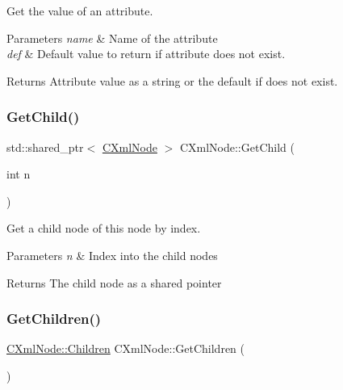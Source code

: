 Get the value of an attribute. 


\begin{DoxyParams}{Parameters}
{\em name} & Name of the attribute \\
\hline
{\em def} & Default value to return if attribute does not exist. \\
\hline
\end{DoxyParams}
\begin{DoxyReturn}{Returns}
Attribute value as a string or the default if does not exist. 
\end{DoxyReturn}
\mbox{\label{classxmlnode_1_1_c_xml_node_ac5700bda1faebcbe5bb042e043ea60be}} 
\subsubsection{\texorpdfstring{Get\+Child()}{GetChild()}}
{\footnotesize\ttfamily std\+::shared\+\_\+ptr$<$ \mbox{\hyperlink{classxmlnode_1_1_c_xml_node}{C\+Xml\+Node}} $>$ C\+Xml\+Node\+::\+Get\+Child (\begin{DoxyParamCaption}\item[{int}]{n }\end{DoxyParamCaption})}



Get a child node of this node by index. 


\begin{DoxyParams}{Parameters}
{\em n} & Index into the child nodes \\
\hline
\end{DoxyParams}
\begin{DoxyReturn}{Returns}
The child node as a shared pointer 
\end{DoxyReturn}
\mbox{\label{classxmlnode_1_1_c_xml_node_a03f86570ca40d4cc09c3e1841939a9d0}} 
\subsubsection{\texorpdfstring{Get\+Children()}{GetChildren()}}
{\footnotesize\ttfamily \mbox{\hyperlink{classxmlnode_1_1_c_xml_node_1_1_children}{C\+Xml\+Node\+::\+Children}} C\+Xml\+Node\+::\+Get\+Children (\begin{DoxyParamCaption}{ }\end{DoxyParamCaption})}



